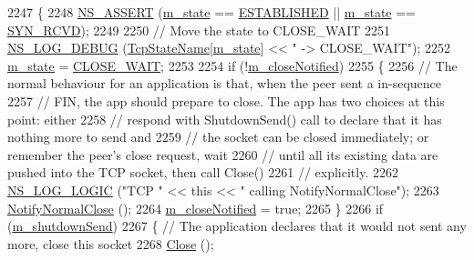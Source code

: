 \begin{DoxyCode}
2247 \{
2248   \hyperlink{assert_8h_a6dccdb0de9b252f60088ce281c49d052}{NS\_ASSERT} (\hyperlink{classns3_1_1TcpSocketBase_a5db6f29272f23546e23320c06a681f3e}{m\_state} == \hyperlink{group__tcp_gga3929cdb47bdf159657fa24054aa5ca03a1826ad465d372319d1db905886de3743}{ESTABLISHED} || \hyperlink{classns3_1_1TcpSocketBase_a5db6f29272f23546e23320c06a681f3e}{m\_state} == 
      \hyperlink{group__tcp_gga3929cdb47bdf159657fa24054aa5ca03abdb50eab9f592a17a412a62deddde11a}{SYN\_RCVD});
2249 
2250   \textcolor{comment}{// Move the state to CLOSE\_WAIT}
2251   \hyperlink{group__logging_ga413f1886406d49f59a6a0a89b77b4d0a}{NS\_LOG\_DEBUG} (\hyperlink{classns3_1_1TcpSocket_a1706f3309652d17f052b7d05816dd5ba}{TcpStateName}[\hyperlink{classns3_1_1TcpSocketBase_a5db6f29272f23546e23320c06a681f3e}{m\_state}] << \textcolor{stringliteral}{" -> CLOSE\_WAIT"});
2252   \hyperlink{classns3_1_1TcpSocketBase_a5db6f29272f23546e23320c06a681f3e}{m\_state} = \hyperlink{group__tcp_gga3929cdb47bdf159657fa24054aa5ca03a812907d056aeb79789f671d657f076a3}{CLOSE\_WAIT};
2253 
2254   \textcolor{keywordflow}{if} (!\hyperlink{classns3_1_1TcpSocketBase_a8b9716e924553832a827b6efe214b70f}{m\_closeNotified})
2255     \{
2256       \textcolor{comment}{// The normal behaviour for an application is that, when the peer sent a in-sequence}
2257       \textcolor{comment}{// FIN, the app should prepare to close. The app has two choices at this point: either}
2258       \textcolor{comment}{// respond with ShutdownSend() call to declare that it has nothing more to send and}
2259       \textcolor{comment}{// the socket can be closed immediately; or remember the peer's close request, wait}
2260       \textcolor{comment}{// until all its existing data are pushed into the TCP socket, then call Close()}
2261       \textcolor{comment}{// explicitly.}
2262       \hyperlink{group__logging_ga88acd260151caf2db9c0fc84997f45ce}{NS\_LOG\_LOGIC} (\textcolor{stringliteral}{"TCP "} << \textcolor{keyword}{this} << \textcolor{stringliteral}{" calling NotifyNormalClose"});
2263       \hyperlink{classns3_1_1Socket_a6bdec380c7dacff36147b89a05ceae84}{NotifyNormalClose} ();
2264       \hyperlink{classns3_1_1TcpSocketBase_a8b9716e924553832a827b6efe214b70f}{m\_closeNotified} = \textcolor{keyword}{true};
2265     \}
2266   \textcolor{keywordflow}{if} (\hyperlink{classns3_1_1TcpSocketBase_a443b4ee2b08a845f9429e150d1171a23}{m\_shutdownSend})
2267     \{ \textcolor{comment}{// The application declares that it would not sent any more, close this socket}
2268       \hyperlink{classns3_1_1TcpSocketBase_adab0076d02811c29ea9ced8b10e7a878}{Close} ();

\end{DoxyCode}
